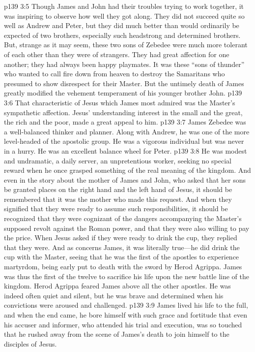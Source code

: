 \vs p139 3:5 Though James and John had their troubles trying to work together, it was inspiring to observe how well they got along. They did not succeed quite so well as Andrew and Peter, but they did much better than would ordinarily be expected of two brothers, especially such headstrong and determined brothers. But, strange as it may seem, these two sons of Zebedee were much more tolerant of each other than they were of strangers. They had great affection for one another; they had always been happy playmates. It was these “sons of thunder” who wanted to call fire down from heaven to destroy the Samaritans who presumed to show disrespect for their Master. But the untimely death of James greatly modified the vehement temperament of his younger brother John.
\pc \vs p139 3:6 That characteristic of Jesus which James most admired was the Master’s sympathetic affection. Jesus’ understanding interest in the small and the great, the rich and the poor, made a great appeal to him.
\pc \vs p139 3:7 James Zebedee was a well\hyp{}balanced thinker and planner. Along with Andrew, he was one of the more level\hyp{}headed of the apostolic group. He was a vigorous individual but was never in a hurry. He was an excellent balance wheel for Peter.
\vs p139 3:8 He was modest and undramatic, a daily server, an unpretentious worker, seeking no special reward when he once grasped something of the real meaning of the kingdom. And even in the story about the mother of James and John, who asked that her sons be granted places on the right hand and the left hand of Jesus, it should be remembered that it was the mother who made this request. And when they signified that they were ready to assume such responsibilities, it should be recognized that they were cognizant of the dangers accompanying the Master’s supposed revolt against the Roman power, and that they were also willing to pay the price. When Jesus asked if they were ready to drink the cup, they replied that they were. And as concerns James, it was literally true---he did drink the cup with the Master, seeing that he was the first of the apostles to experience martyrdom, being early put to death with the sword by Herod Agrippa. James was thus the first of the twelve to sacrifice his life upon the new battle line of the kingdom. Herod Agrippa feared James above all the other apostles. He was indeed often quiet and silent, but he was brave and determined when his convictions were aroused and challenged.
\pc \vs p139 3:9 James lived his life to the full, and when the end came, he bore himself with such grace and fortitude that even his accuser and informer, who attended his trial and execution, was so touched that he rushed away from the scene of James’s death to join himself to the disciples of Jesus.
